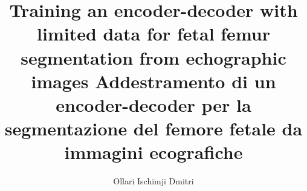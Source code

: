 \documentclass[12pt]{article}
\begin{document}
\title{
	Training an encoder-decoder with limited data for fetal femur segmentation from echographic images \newline
	\large Addestramento di un encoder-decoder per la segmentazione del femore fetale da immagini ecografiche}
\author{Ollari Ischimji Dmitri}

\maketitle

\newpage

\tableofcontents
\listoffigures
\listoftables

\newpage




\newpage


\end{document}
